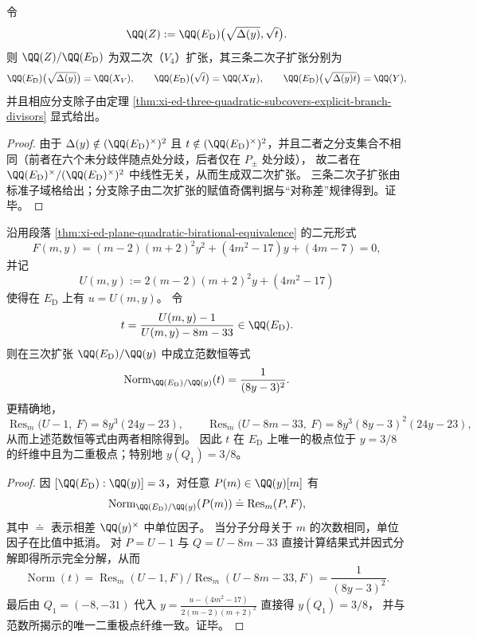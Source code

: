 \begin{proposition}[双二次子域格与三条二次子扩张]\label{prop:xi-ed-v4-biquadratic-subfield-lattice}
令
\[
\QQ(Z):=\QQ(E_{\mathrm D})\bigl(\sqrt{\Delta(y)},\sqrt{t}\bigr).
\]
则 \(\QQ(Z)/\QQ(E_{\mathrm D})\) 为双二次（\(V_4\)）扩张，其三条二次子扩张分别为
\[
\QQ(E_{\mathrm D})\bigl(\sqrt{\Delta(y)}\bigr)=\QQ(X_V),\qquad
\QQ(E_{\mathrm D})\bigl(\sqrt{t}\bigr)=\QQ(X_H),\qquad
\QQ(E_{\mathrm D})\bigl(\sqrt{\Delta(y)t}\bigr)=\QQ(Y),
\]
并且相应分支除子由定理 \ref{thm:xi-ed-three-quadratic-subcovers-explicit-branch-divisors} 显式给出。
\end{proposition}
\begin{proof}
由于 \(\Delta(y)\notin (\QQ(E_{\mathrm D})^\times)^2\) 且 \(t\notin(\QQ(E_{\mathrm D})^\times)^2\)，并且二者之分支集合不相同（前者在六个未分歧伴随点处分歧，后者仅在 \(P_\pm\) 处分歧），
故二者在 \(\QQ(E_{\mathrm D})^\times/(\QQ(E_{\mathrm D})^\times)^2\) 中线性无关，从而生成双二次扩张。
三条二次子扩张由标准子域格给出；分支除子由二次扩张的赋值奇偶判据与“对称差”规律得到。证毕。
\end{proof}

\begin{theorem}\label{thm:xi-ed-norm-t-closed-form-resultant-factorization}
沿用段落 \ref{thm:xi-ed-plane-quadratic-birational-equivalence} 的二元形式
\[
F(m,y)=(m-2)(m+2)^2y^2+(4m^2-17)y+(4m-7)=0,
\]
并记
\[
U(m,y):=2(m-2)(m+2)^2y+(4m^2-17)
\]
使得在 \(E_{\mathrm D}\) 上有 \(u=U(m,y)\)。
令
\[
t=\frac{U(m,y)-1}{U(m,y)-8m-33}\in\QQ(E_{\mathrm D}).
\]
则在三次扩张 \(\QQ(E_{\mathrm D})/\QQ(y)\) 中成立范数恒等式
\[
\operatorname{Norm}_{\QQ(E_{\mathrm D})/\QQ(y)}(t)=\frac{1}{(8y-3)^2}.
\]
更精确地，
\[
\operatorname{Res}_m\bigl(U-1,\ F\bigr)=8y^3(24y-23),\qquad
\operatorname{Res}_m\bigl(U-8m-33,\ F\bigr)=8y^3(8y-3)^2(24y-23),
\]
从而上述范数恒等式由两者相除得到。
因此 \(t\) 在 \(E_{\mathrm D}\) 上唯一的极点位于 \(y=3/8\) 的纤维中且为二重极点；特别地 \(y(Q_1)=3/8\)。
\end{theorem}
\begin{proof}
因 \([\QQ(E_{\mathrm D}):\QQ(y)]=3\)，对任意 \(P(m)\in\QQ(y)[m]\) 有
\[
\operatorname{Norm}_{\QQ(E_{\mathrm D})/\QQ(y)}(P(m))\doteq \operatorname{Res}_m(P,F),
\]
其中 \(\doteq\) 表示相差 \(\QQ(y)^\times\) 中单位因子。
当分子分母关于 \(m\) 的次数相同，单位因子在比值中抵消。
对 \(P=U-1\) 与 \(Q=U-8m-33\) 直接计算结果式并因式分解即得所示完全分解，从而
\[
\operatorname{Norm}(t)=\operatorname{Res}_m(U-1,F)\Big/\operatorname{Res}_m(U-8m-33,F)=\frac{1}{(8y-3)^2}.
\]
最后由 \(Q_1=(-8,-31)\) 代入 \(y=\frac{u-(4m^2-17)}{2(m-2)(m+2)^2}\) 直接得 \(y(Q_1)=3/8\)，
并与范数所揭示的唯一二重极点纤维一致。证毕。
\end{proof}


